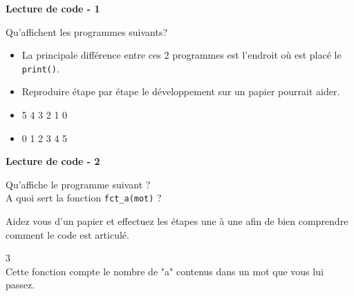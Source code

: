 	\begin{Exercice}[5 minutes] \textbf{Lecture de code - 1} 
	
	Qu'affichent les programmes suivants? \\ 
	
	 
	
	 
	
		\begin{conseil} 
		\begin{itemize} 
			\item La principale différence entre ces 2 programmes est l'endroit où est placé le \lstinline{print()}. 
			\item Reproduire étape par étape le développement sur un papier pourrait aider. 
		\end{itemize} 
		\end{conseil} 
	
		\begin{solution} 
		\begin{itemize} 
			\item 
			5 
			4 
			3 
			2 
			1 
			0 
			\item 
			0 
			1 
			2 
			3 
			4 
			5 
		\end{itemize} 
	
		\end{solution} 
	
	\end{Exercice}
	
	\begin{Exercice}[5 minutes] \textbf{Lecture de code - 2} 
	
	Qu'affiche le programme suivant ? \\ 
	
	A quoi sert la fonction \lstinline{fct_a(mot)} ? \\
	
	  
	
		\begin{conseil} 
		Aidez vous d'un papier et effectuez les étapes une à une afin de bien comprendre comment le code est articulé.
		\end{conseil} 
	
		\begin{solution} 
		3 \\
		
		Cette fonction compte le nombre de "a" contenus dans un mot que vous lui passez.
	
		\end{solution} 
	
	\end{Exercice}
	
